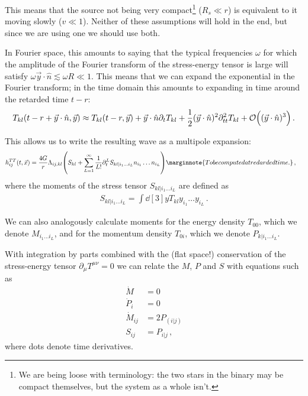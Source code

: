 \documentclass[main.tex]{subfiles}
\begin{document}
This means that the source not being very compact\footnote{We are being loose with terminology: the two stars in the binary may be compact themselves, but the system as a whole isn't. } (\(R_s \ll r\)) is equivalent to it moving slowly (\(v \ll 1\)). 
Neither of these assumptions will hold in the end, but since we are using one we should use both. 

In Fourier space, this amounts to saying that the typical frequencies \(\omega \) for which the amplitude of the Fourier transform of the stress-energy tensor is large will satisfy \(\omega \vec{y} \cdot \hat{n} \lesssim \omega R \ll 1\). 
This means that we can expand the exponential in the Fourier transform; in the time domain this amounts to expanding in time around the retarded time \(t - r\): 
%
\begin{align}
T_{kl} (t-r + \vec{y} \cdot \hat{n}, \vec{y}) \approx T_{kl} (t-r, \vec{y}) + \vec{y} \cdot \hat{n} \partial_{t} T_{kl} + \frac{1}{2} (\vec{y} \cdot \hat{n})^2 \partial^2_{tt} T_{kl} + \order{(\vec{y} \cdot \hat{n})^3}
\,.
\end{align}

This allows us to write the resulting wave as a multipole expansion:
%
\begin{align} \label{eq:gw-expansion-moments-stess-tensor}
h_{ij}^{TT} (t, \vec{x}) &= \frac{4G}{r} \Lambda_{ij, kl} \qty(S_{kl} + \sum_{L=1}^{\infty } \frac{1}{L!} \partial_{t}^{L} S_{kl | i_1 \dots i_L} n_{i_1} \dots n_{i_L})
\marginnote{To be computed at redarded time.}
\,,
\end{align}
%
where the moments of the stress tensor \(S_{kl|i_1 \dots i_L}\) are defined as 
%
\begin{align}
S_{kl | i_1 \dots i_L} = \int \dd[3]{y} T_{kl} y_{i_1} \dots y_{i_L}
\,.
\end{align}

We can also analogously calculate moments for the energy density \(T_{00} \), which we denote \(M_{i_1 \dots i_L}\), and for the momentum density \(T_{0i}\), which we denote \(P_{k|i_1 \dots i_L}\). 

With integration by parts combined with the (flat space!) conservation of the stress-energy tensor \(\partial_{\mu } T^{\mu \nu }= 0\) we can relate the \(M\), \(P\) and \(S\) with equations such as \cite[eqs.\ 3.45--51]{maggioreGravitationalWavesVolume2007}
%
\begin{subequations}
\begin{align}
\dot{M} &= 0  \\
\dot{P}_{i} &= 0 \\
\dot{M}_{ij} &= 2 P_{(i|j)}   \\
S_{ij} &= P_{i | j}
\,,
\end{align}
\end{subequations}
%
where dots denote time derivatives.
\end{document}
